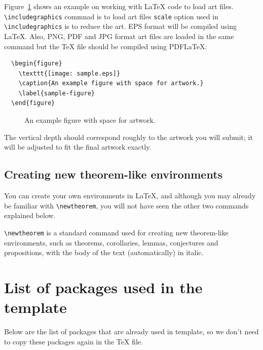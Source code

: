 \documentclass[lineno]{JFM-FLM_Au}
\begin{document}
Figure~\ref{sample-figure} shows an example on working with LaTeX code to load art files. \verb"\includegraphics" commnad is to load art files \verb"scale" option used in \verb"\includegraphics" is to reduce the art. EPS format will be compiled using LaTeX. Also, PNG, PDF and JPG format art files are loaded in the same command but the TeX file should be compiled using PDFLaTeX:
%
\begin{verbatim}
  \begin{figure}
    \texttt{[image: sample.eps]}
    \caption{An example figure with space for artwork.}
    \label{sample-figure}
  \end{figure}
\end{verbatim}
%
\begin{figure}%
  \centerline{}
  \caption{An example figure with space for artwork.}
  \label{sample-figure}
\end{figure}
%
The vertical depth should correspond roughly to the artwork you will submit;
it will be adjusted to fit the final artwork exactly.

\subsection{Creating new theorem-like environments}

You can create your own environments in LaTeX, and although you may already
be familiar with \verb"\newtheorem", you will not have seen the other two
commands explained below.

\verb"\newtheorem" is a standard command used for creating new
        theorem-like environments, such as theorems, corollaries, lemmas,
        conjectures and propositions, with the body of the text
        (automatically) in italic.

\section{List of packages used in the template}

Below are the list of packages that are already used in template, so we don't need to copy these packages again in the TeX file.
\end{document}

